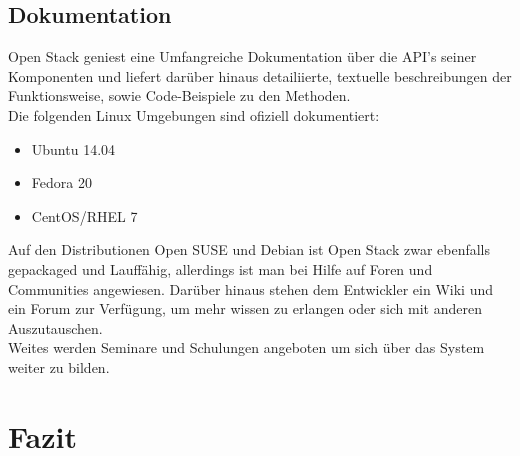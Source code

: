 \documentclass[a4paper,nochapterprefix,ngerman,12pt]{scrreprt}
\begin{document}
\section{Dokumentation}
Open Stack geniest eine Umfangreiche Dokumentation über die API's seiner Komponenten und liefert darüber hinaus detailiierte, textuelle beschreibungen der Funktionsweise, sowie Code-Beispiele zu den Methoden.\\
Die folgenden Linux Umgebungen sind ofiziell dokumentiert:
\begin{itemize}
	\item Ubuntu 14.04
	\item Fedora 20
	\item CentOS/RHEL 7
\end{itemize}
Auf den Distributionen Open SUSE und Debian ist Open Stack zwar ebenfalls gepackaged und Lauffähig, allerdings ist man bei Hilfe auf Foren und Communities angewiesen.
Darüber hinaus stehen dem Entwickler ein Wiki und ein Forum zur Verfügung, um mehr wissen zu erlangen oder sich mit anderen Auszutauschen.\\
Weites werden Seminare und Schulungen angeboten um sich über das System weiter zu bilden.

\chapter{Fazit} \thispagestyle{fancy}


 \thispagestyle{fancy}
 \thispagestyle{fancy}

\listoffigures \thispagestyle{fancy}

\printglossary[style=tree,title={Glossar}]  \thispagestyle{fancy}

\label{lastpage}
\end{document}
